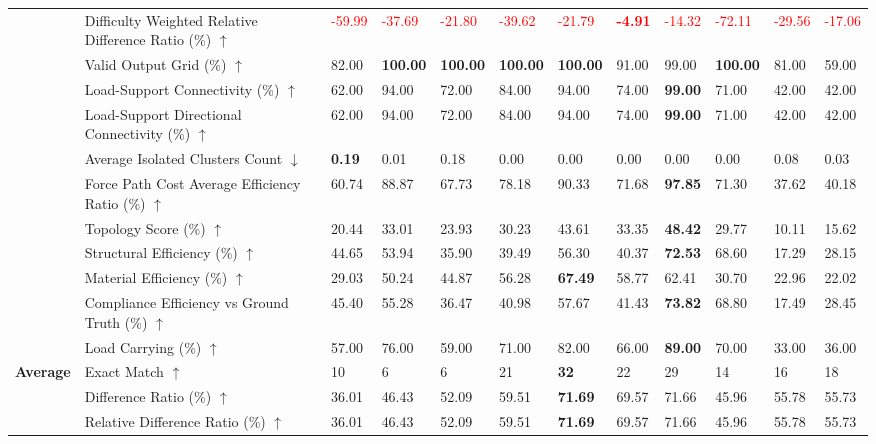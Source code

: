 \begin{table}[!h]
{\begin{tabular}{llllllllllll}
 & Difficulty Weighted Relative Difference Ratio (\%) $\uparrow$ & \textcolor{red}{-59.99} & \textcolor{red}{-37.69} & \textcolor{red}{-21.80} & \textcolor{red}{-39.62} & \textcolor{red}{-21.79} & \textbf{\textcolor{red}{-4.91}} & \textcolor{red}{-14.32} & \textcolor{red}{-72.11} & \textcolor{red}{-29.56} & \textcolor{red}{-17.06} \\
 & Valid Output Grid (\%) $\uparrow$ & 82.00 & \textbf{100.00} & \textbf{100.00} & \textbf{100.00} & \textbf{100.00} & 91.00 & 99.00 & \textbf{100.00} & 81.00 & 59.00 \\
 & Load-Support Connectivity (\%) $\uparrow$ & 62.00 & 94.00 & 72.00 & 84.00 & 94.00 & 74.00 & \textbf{99.00} & 71.00 & 42.00 & 42.00 \\
 & Load-Support Directional Connectivity (\%) $\uparrow$ & 62.00 & 94.00 & 72.00 & 84.00 & 94.00 & 74.00 & \textbf{99.00} & 71.00 & 42.00 & 42.00 \\
 & Average Isolated Clusters Count $\downarrow$ & \textbf{0.19} & 0.01 & 0.18 & 0.00 & 0.00 & 0.00 & 0.00 & 0.00 & 0.08 & 0.03 \\
 & Force Path Cost Average Efficiency Ratio (\%) $\uparrow$ & 60.74 & 88.87 & 67.73 & 78.18 & 90.33 & 71.68 & \textbf{97.85} & 71.30 & 37.62 & 40.18 \\
 & Topology Score (\%) $\uparrow$ & 20.44 & 33.01 & 23.93 & 30.23 & 43.61 & 33.35 & \textbf{48.42} & 29.77 & 10.11 & 15.62 \\
 & Structural Efficiency (\%) $\uparrow$ & 44.65 & 53.94 & 35.90 & 39.49 & 56.30 & 40.37 & \textbf{72.53} & 68.60 & 17.29 & 28.15 \\
 & Material Efficiency (\%) $\uparrow$ & 29.03 & 50.24 & 44.87 & 56.28 & \textbf{67.49} & 58.77 & 62.41 & 30.70 & 22.96 & 22.02 \\
 & Compliance Efficiency vs Ground Truth (\%) $\uparrow$ & 45.40 & 55.28 & 36.47 & 40.98 & 57.67 & 41.43 & \textbf{73.82} & 68.80 & 17.49 & 28.45 \\
 & Load Carrying (\%) $\uparrow$ & 57.00 & 76.00 & 59.00 & 71.00 & 82.00 & 66.00 & \textbf{89.00} & 70.00 & 33.00 & 36.00 \\
\midrule
\textbf{Average} & Exact Match $\uparrow$ & 10 & 6 & 6 & 21 & \textbf{32} & 22 & 29 & 14 & 16 & 18 \\
 & Difference Ratio (\%) $\uparrow$ & 36.01 & 46.43 & 52.09 & 59.51 & \textbf{71.69} & 69.57 & 71.66 & 45.96 & 55.78 & 55.73 \\
 & Relative Difference Ratio (\%) $\uparrow$ & 36.01 & 46.43 & 52.09 & 59.51 & \textbf{71.69} & 69.57 & 71.66 & 45.96 & 55.78 & 55.73 \\

\end{tabular}}
\end{table}
